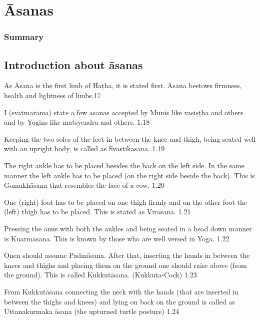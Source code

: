 \chapter{Āsanas}

\subsection*{Summary}

\section*{Introduction about āsanas}

As Āsana is the first limb of Haṭha, it is stated first. Āsana bestows firmness, health and lightness of limbs.17 

I (svātmārāma) state a few āsanas accepted by Munis like vasiṣṭha and others and by Yogins like matsyendra and others.  1.18


Keeping the two soles of the feet in between the knee and thigh, being seated well with an upright body, is called as Svastikāsana.  1.19


The right ankle has to be placed besides the back on the left side. In the same manner the left ankle has to be placed (on the right side beside the back). This is Gomukhāsana that resembles the face of a cow. 1.20


One (right) foot has to be placed on one thigh firmly and on the other foot the (left) thigh has to be placed. This is stated as Virāsana. 1.21


Pressing the anus with both the ankles and being seated in a head down manner is Kuarmāsana. This is known by those who are well versed in Yoga. 1.22


Onen should assume Padmāsana. After that, inserting the hands in between the knees and thighs and placing them on the ground one should raise above (from the ground). This is called Kukkutāsana. (Kukkuta-Cock) 1.23


From Kukkutāsana connecting the neck with the hands (that are inserted in between the thighs and knees) and lying on back on the ground is called as Uttanakurmaka āsana (the upturned turtle posture) 1.24

